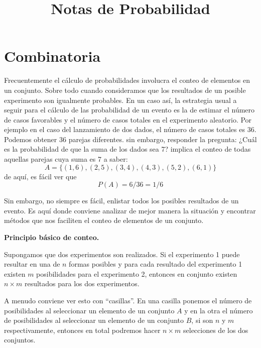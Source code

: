 \documentclass[14pt]{extreport}
\title{Notas de Probabilidad}
\theoremstyle{definicion}
\theoremstyle{propiedad}
\begin{document}
\chapter{Combinatoria}
Frecuentemente el cálculo de probabilidades involucra el conteo de elementos en un conjunto. Sobre todo cuando consideramos que los resultados de un posible experimento son igualmente probables. En un caso así, la estrategia usual a seguir para el cálculo de las probabilidad de un evento es la de estimar el número de casos favorables y el número de casos totales en el experimento aleatorio. Por ejemplo en el caso del lanzamiento de dos dados, el número de casos totales es 36. Podemos obtener 36 parejas diferentes. sin embargo, responder la pregunta: ¿Cuál es la probabilidad de que la suma de los dados sea 7? implica el conteo de todas aquellas parejas cuya suma es 7 a saber:
$$
  A = \{(1, 6), (2, 5), (3, 4), (4, 3), (5, 2), (6, 1)\}
$$
de aquí, es fácil ver que
$$
  P(A) = 6/36 = 1/6
$$

Sin embargo, no siempre es fácil, enlistar todos los
posibles resultados de un evento. Es aquí donde conviene analizar de
mejor manera la situación y encontrar métodos que nos faciliten el
conteo de elementos de un conjunto.


\textbf{Principio básico de conteo.}

Supongamos que dos experimentos son realizados. Si el experimento 1 puede resultar en una de $n$ formas posibles y para cada resultado del experimento 1 existen $m$ posibilidades para el experimento 2, entonces en conjunto existen $n\times m$ resultados para los dos experimentos.


A menudo conviene ver esto con ``casillas''. En una casilla ponemos el número de posibilidades al seleccionar un elemento de un conjunto $A$ y en la otra el número de posibilidades al seleccionar un elemento de un conjunto $B$, si son $n$ y $m$ respectivamente, entonces en total podremos hacer $n\times m$ selecciones de los dos conjuntos.

\begin{center}

\end{center}
\end{document}
